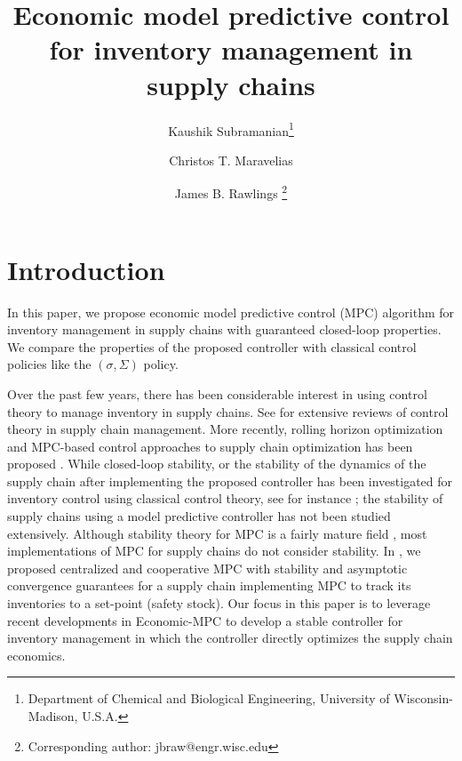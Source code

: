 \documentclass[10pt]{article}
\title{\LARGE \bf {Economic model predictive control for inventory management in
    supply chains}}
\author{Kaushik Subramanian\thanks{Department of Chemical and Biological Engineering, University
  of Wisconsin-Madison, U.S.A.} \and Christos T. Maravelias\footnotemark[1] \and James B. Rawlings
\thanks{Corresponding author: jbraw@engr.wisc.edu}\footnotemark[1]}
\theoremstyle{definition}
\begin{document}
\maketitle
\section{Introduction}
In this paper, we propose  economic model predictive
control (MPC) algorithm for inventory management in supply
chains with guaranteed closed-loop properties. We compare the
properties of the proposed controller with classical control policies
like the $(\sigma,\Sigma) $ policy. 

Over the past few years, there has been considerable interest in using
control theory to manage inventory in supply chains. See
\citet{sarimevis:patrinos:tarantilis:kiranoudis:2008,ortega:lin:2004}
for extensive reviews of control theory in supply chain
management. More recently, rolling horizon optimization and MPC-based
control approaches to supply chain optimization has been proposed \citep{
perealopez:ydstie:grossmann:2003,mestan:turkay:arkun:2006,dunbar:desa:2007a,
seferlis:giannelos:2004,kempf:2004,braun:rivera:carlyle:kempf:2002,Maestre:Pena:Camacho:2009}. While
closed-loop stability, or the stability of the dynamics of the supply
chain after implementing the proposed controller has been investigated
for inventory control using classical control theory, see for
instance
\citet{lin:wong:jang:shieh:chu:2004,venkateswaran:son:2005,hoberg:bradley:thonemann:2007};
the stability of supply chains using a model predictive controller has
not been studied extensively. Although stability theory for MPC is a
fairly mature field  \citep[Chapter 2]{rawlings:mayne:2009}, most
implementations of MPC for supply chains do not consider stability. In
\citet{subramanian:rawlings:maravelias:2012}, we proposed centralized
and cooperative MPC with stability and asymptotic convergence
guarantees for a  supply chain implementing MPC to track its
inventories to a set-point (safety stock). Our focus in this paper is to leverage
recent developments in Economic-MPC
\citep{amrit:rawlings:angeli:2011,diehl:amrit:rawlings:2011} to
develop a stable controller for inventory management in which the
controller directly optimizes the supply chain economics.
\end{document}
